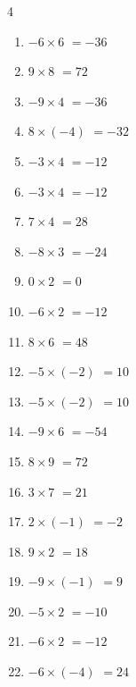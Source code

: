 \begin{multicols}{4}
\begin{enumerate}
  \item $-6\times 6$
        $=-36$

  \item $9\times 8$
        $=72$

  \item $-9\times 4$
        $=-36$

  \item $8\times (-4)$
        $=-32$

  \item $-3\times 4$
        $=-12$

  \item $-3\times 4$
        $=-12$

  \item $7\times 4$
        $=28$

  \item $-8\times 3$
        $=-24$

  \item $0\times 2$
        $=0$

  \item $-6\times 2$
        $=-12$

\columnbreak %

  \item $8\times 6$
        $=48$

  \item $-5\times (-2)$
        $=10$

  \item $-5\times (-2)$
        $=10$

  \item $-9\times 6$
        $=-54$

  \item $8\times 9$
        $=72$

  \item $3\times 7$
        $=21$

  \item $2\times (-1)$
        $=-2$

  \item $9\times 2$
        $=18$

  \item $-9\times (-1)$
        $=9$

  \item $-5\times 2$
        $=-10$

  \item $-6\times 2$
        $=-12$

  \item $-6\times (-4)$
        $=24$


\end{enumerate}
\end{multicols}
